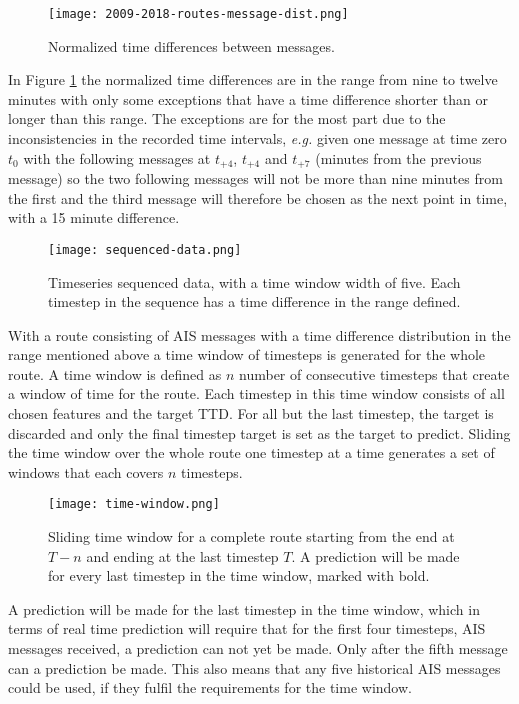 \documentclass[../main.tex]{subfiles}
\begin{document}
\begin{figure}[H]
	\centering
	\texttt{[image: 2009-2018-routes-message-dist.png]}
	\caption{Normalized time differences between messages.}
	\label{fig:norm-time}
\end{figure}

In Figure \ref{fig:norm-time} the normalized time differences are in the range from nine to twelve minutes with only some exceptions that have a time difference shorter than or longer than this range. The exceptions are for the most part due to the inconsistencies in the recorded time intervals, \textit{e.g.} given one message at time zero $t_0$ with the following messages at $t_{+4}$, $t_{+4}$ and $t_{+7}$ (minutes from the previous message) so the two following messages will not be more than nine minutes from the first and the third message will therefore be chosen as the next point in time, with a 15 minute difference. 

\begin{figure}[H]
	\centering
	\texttt{[image: sequenced-data.png]}
	\caption{Timeseries sequenced data, with a time window width of five. Each timestep in the sequence has a time difference in the range defined.}
	\label{fig:seq-data}
\end{figure}

With a route consisting of AIS messages with a time difference distribution in the range mentioned above a time window of timesteps is generated for the whole route. A time window is defined as $n$ number of consecutive timesteps that create a window of time for the route. Each timestep in this time window consists of all chosen features and the target TTD. For all but the last timestep, the target is discarded and only the final timestep target is set as the target to predict. Sliding the time window over the whole route one timestep at a time generates a set of windows that each covers $n$ timesteps. 

\begin{figure}[H]
	\centering
	\texttt{[image: time-window.png]}
	\caption{Sliding time window for a complete route starting from the end at $T-n$ and ending at the last timestep $T$. A prediction will be made for every last timestep in the time window, marked with bold.}
	\label{fig:time-window}
\end{figure}

A prediction will be made for the last timestep in the time window, which in terms of real time prediction will require that for the first four timesteps, AIS messages received, a prediction can not yet be made. Only after the fifth message can a prediction be made. This also means that any five historical AIS messages could be used, if they fulfil the requirements for the time window.
\end{document}
